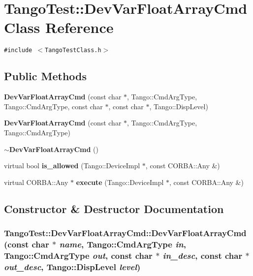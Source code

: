 \section{Tango\-Test::Dev\-Var\-Float\-Array\-Cmd  Class Reference}
\label{classTangoTest_1_1DevVarFloatArrayCmd}
{\tt \#include $<$Tango\-Test\-Class.h$>$}

\subsection*{Public Methods}
\begin{CompactItemize}
\item 
{\bf Dev\-Var\-Float\-Array\-Cmd} (const char $\ast$, Tango::Cmd\-Arg\-Type, Tango::Cmd\-Arg\-Type, const char $\ast$, const char $\ast$, Tango::Disp\-Level)
\item 
{\bf Dev\-Var\-Float\-Array\-Cmd} (const char $\ast$, Tango::Cmd\-Arg\-Type, Tango::Cmd\-Arg\-Type)
\item 
{\bf $\sim$Dev\-Var\-Float\-Array\-Cmd} ()
\item 
virtual bool {\bf is\_\-allowed} (Tango::Device\-Impl $\ast$, const CORBA::Any \&)
\item 
virtual CORBA::Any $\ast$ {\bf execute} (Tango::Device\-Impl $\ast$, const CORBA::Any \&)
\end{CompactItemize}


\subsection{Constructor \& Destructor Documentation}
\subsubsection{\setlength{\rightskip}{0pt plus 5cm}Tango\-Test::Dev\-Var\-Float\-Array\-Cmd::Dev\-Var\-Float\-Array\-Cmd (const char $\ast$ {\em name}, Tango::Cmd\-Arg\-Type {\em in}, Tango::Cmd\-Arg\-Type {\em out}, const char $\ast$ {\em in\_\-desc}, const char $\ast$ {\em out\_\-desc}, Tango::Disp\-Level {\em level})}\label{classTangoTest_1_1DevVarFloatArrayCmd_a0}


